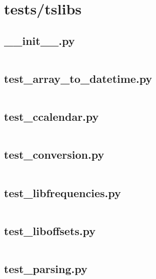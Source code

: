 \documentclass{article}
\begin{document}
\section{tests/tslibs}

\subsection{\_\_init\_\_.py}
\inputminted{python}{/home/dufferzafar/dev/@clones/pandas/pandas/tests/tslibs/__init__.py}
\newpage

\subsection{test\_array\_to\_datetime.py}
\inputminted{python}{/home/dufferzafar/dev/@clones/pandas/pandas/tests/tslibs/test_array_to_datetime.py}
\newpage

\subsection{test\_ccalendar.py}
\inputminted{python}{/home/dufferzafar/dev/@clones/pandas/pandas/tests/tslibs/test_ccalendar.py}
\newpage

\subsection{test\_conversion.py}
\inputminted{python}{/home/dufferzafar/dev/@clones/pandas/pandas/tests/tslibs/test_conversion.py}
\newpage

\subsection{test\_libfrequencies.py}
\inputminted{python}{/home/dufferzafar/dev/@clones/pandas/pandas/tests/tslibs/test_libfrequencies.py}
\newpage

\subsection{test\_liboffsets.py}
\inputminted{python}{/home/dufferzafar/dev/@clones/pandas/pandas/tests/tslibs/test_liboffsets.py}
\newpage

\subsection{test\_parsing.py}
\inputminted{python}{/home/dufferzafar/dev/@clones/pandas/pandas/tests/tslibs/test_parsing.py}
\newpage
\end{document}
